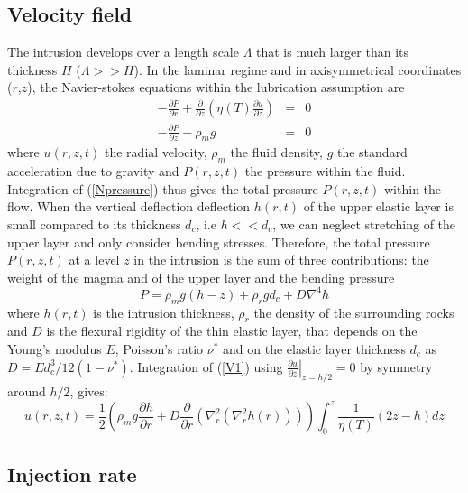 \subsection{Velocity field}
\label{sec:Velocity field}

The  intrusion develops  over a  length scale  $\Lambda$ that  is much
larger than its thickness $H$ ($\Lambda >> H$).  In the laminar regime
and  in   axisymmetrical  coordinates  ($r$,$z$),   the  Navier-stokes
equations within the lubrication assumption are
\begin{eqnarray}
  -\frac{\partial P}{\partial r}  +  \frac{\partial}{\partial z}\left(\eta(T) \frac{\partial u}{\partial z}\right) &=&0\label{V1} \\
  -\frac{\partial P}{\partial z}  - \rho_{m}g&  =&0\label{Npressure}
\end{eqnarray}
where $u(r,z,t)$ the radial velocity,  $\rho_m$ the fluid density, $g$
the standard acceleration  due to gravity and  $P(r,z,t)$ the pressure
within  the fluid.   Integration of  (\ref{Npressure}) thus  gives the
total  pressure  $P(r,z,t)$  within   the  flow.   When  the  vertical
deflection deflection  $h(r,t)$ of  the upper  elastic layer  is small
compared  to  its  thickness  $d_c$,  i.e  $h<<d_c$,  we  can  neglect
stretching   of   the   upper   layer  and   only   consider   bending
stresses. Therefore, the  total pressure $P(r,z,t)$ at a  level $z$ in
the intrusion  is the sum  of three  contributions: the weight  of the
magma and of the upper layer and the bending pressure
\begin{equation}
  P = \rho_m g (h-z)+\rho_rgd_c+D\nabla^4h
\end{equation}
where $h(r,t)$ is the intrusion thickness, $\rho_r$ the density of the
surrounding rocks and $D$ is the flexural rigidity of the thin elastic
layer,  that  depends on  the  Young's  modulus $E$,  Poisson's  ratio
$\nu^*$   and    on   the    elastic   layer   thickness    $d_c$   as
$D   =   Ed_c^3/12(1-\nu^*)$.    Integration   of   (\ref{V1})   using
$\left.\frac{\partial  u}{\partial  z}\right|_{z=h/2}=0$  by  symmetry
around $h/2$, gives:
\begin{equation}
  u(r,z,t)=\frac{1}{2}\left(\rho_m g \frac{\partial h}{\partial      r}+D\frac{\partial}{\partial      r}\left(\nabla^{2}_{r}\left( \nabla^{2}_{r}h(r) \right)\right)\right)\int_0^z
  \frac{1}{\eta(T)}\left( 2 z -h\right)dz
  \label{V2}
\end{equation}

\subsection{Injection rate}

